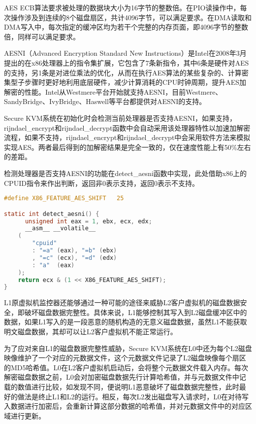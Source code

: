 AES ECB算法要求被处理的数据块大小为16字节的整数倍。在PIO读操作中，每次操作涉及到连续的8个磁盘扇区，共计4096字节，可以满足要求。在DMA读取和DMA写入中，每次指定的缓冲区均为若干个完整的内存页面，即4096字节的整数倍，同样可以满足要求。

AESNI（Advanced Encryption Standard New Instructions）\cite{rott2010intel}是Intel在2008年3月提出的在x86处理器上的指令集扩展，它包含了7条新指令，其中6条是硬件对AES的支持，另1条是对进位乘法的优化，从而在执行AES算法的某些复杂的、计算密集型子步骤时更好地利用底层硬件，减少计算消耗的CPU时钟周期，提升AES加解密的性能。Intel从Westmere平台开始就支持AESNI，目前Westmere、SandyBridge、IvyBridge、Haswell等平台都提供对AESNI的支持。

Secure KVM系统在初始化时会检测当前处理器是否支持AESNI，如果支持，rijndael\_encrypt和rijndael\_decrypt函数中会自动采用该处理器特性以加速加解密流程，如果不支持，rijndael\_encrypt和rijndael\_decrypt中会采用软件方法来模拟实现AES。两者最后得到的加解密结果是完全一致的，仅在速度性能上有50\%左右的差距。

检测处理器是否支持AESNI的功能在detect\_aesni函数中实现，此处借助x86上的CPUID指令来作出判断，返回非0表示支持，返回0表示不支持。

\begin{lstlisting}[language={C}, caption={detect\_aesni函数实现源码}]
#define X86_FEATURE_AES_SHIFT	25

static int detect_aesni() {
	  unsigned int eax = 1, ebx, ecx, edx;
	  __asm__ __volatile__
    (
        "cpuid"
        : "=a" (eax), "=b" (ebx)
        , "=c" (ecx), "=d" (edx)
        : "a"  (eax)
    );
    return ecx & (1 << X86_FEATURE_AES_SHIFT);
}
\end{lstlisting}

L1原虚拟机监控器还能够通过一种可能的途径来威胁L2客户虚拟机的磁盘数据安全，即破坏磁盘数据完整性。具体来说，L1能够控制其写入到L2磁盘缓冲区中的数据，如果L1写入的是一段恶意的随机构造的无意义磁盘数据，虽然L1不能获取明文磁盘数据，其却可以让L2客户虚拟机不能正常运行。

为了应对来自L1的磁盘数据完整性威胁，Secure KVM系统在L0中还为每个L2磁盘映像维护了一个对应的元数据文件，这个元数据文件记录了L2磁盘映像每个扇区的MD5哈希值。L0在L2客户虚拟机启动后，会将整个元数据文件载入内存。每次解密磁盘数据之前，L0会对加密磁盘数据先行计算哈希值，并与元数据文件中记载的数值进行比较，如发现不同，便说明L1恶意破坏了磁盘数据完整性，此时最好的做法是终止L1和L2的运行。相反，每次L2发出磁盘写入请求时，L0在对待写入数据进行加密后，会重新计算这部分数据的哈希值，并对元数据文件中的对应区域进行更新。

